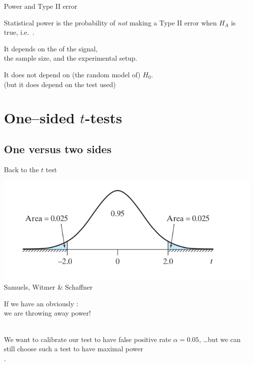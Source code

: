 \begin{frame}{Power and Type II error}

    \begin{block}{}
        \alert{Statistical power} is the probability of \emph{not} making a Type II error when $H_A$ is true,
        i.e.\ .
    \end{block}
    

    \vspace{2em}

    It depends on the  of the signal,\\
    the sample size, and the experimental setup.


    \vspace{2em}

    It does \alert{not} depend on (the random model of) $H_0$.\\
    (but it does depend on the test used)

\end{frame}



\section{One--sided $t$-tests}

\subsection{One versus two sides}


\begin{frame}{Back to the $t$ test}


    \begin{center}
        \includegraphics[width=.75\textwidth]{two-tailed-t}
        \flushright \tiny {Samuels, Witmer \& Schaffner}
    \end{center}
    
    If we have an obviously :\\
    we are throwing away power!

    \vspace{2em}

     \\
    We want to calibrate our test
    to have \alert{false positive rate} $\alpha=0.05$,
    \ldots but we can still choose such a test to have maximal power \\
    .
\end{frame}

